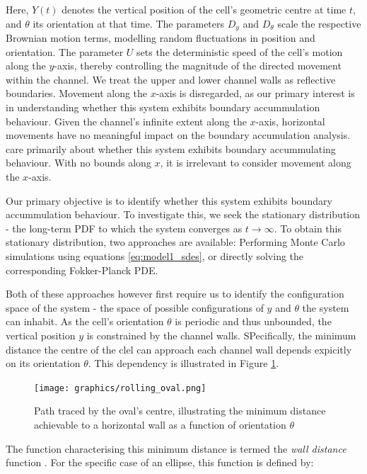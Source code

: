 Here, $Y(t)$ denotes the vertical position of the cell's geometric centre at time $t$,
and $\theta$ its orientation at that time. The parameters 
$D_y$ and $D_\theta$ scale the respective Brownian motion terms, modelling random
fluctuations in position and orientation. The parameter $U$ sets the deterministic speed 
of the cell's motion along the $y$-axis, thereby controlling the magnitude of the directed 
movement within the channel. We treat the upper and lower channel walls as 
reflective boundaries. Movement along the $x$-axis is disregarded, as our primary interest is in understanding
whether this system exhibits boundary accummulation behaviour. Given the channel's infinite extent along
the $x$-axis, horizontal movements have no meaningful impact on the boundary accumulation analysis. 
care primarily about whether this system exhibits boundary accummulating behaviour. With no bounds along $x$, 
it is irrelevant to consider movement along the $x$-axis. 

Our primary objective is to identify whether this system exhibits boundary accummulation behaviour. To
investigate this, we seek the stationary distribution - the long-term PDF to which the system converges as
$t \to \infty$. To obtain this stationary distribution, two approaches are available: Performing Monte Carlo 
simulations using equations \eqref{eq:model1_sdes}, or directly solving the corresponding Fokker-Planck PDE.

Both of these approaches however first require us to identify the configuration space of the system - the space of 
possible configurations of $y$ and $\theta$ the system can inhabit. As the cell's orientation $\theta$ is periodic
and thus unbounded, the vertical position $y$ is constrained by the channel walls. SPecifically, the minimum 
distance the centre of the clel can approach each channel wall depends expicitly on its orientation $\theta$. 
This dependency is illustrated in Figure \ref{fig:rolling_oval}.

\begin{figure}[htbp]
    \centering
    \texttt{[image: graphics/rolling\_oval.png]}
    \caption{Path traced by the oval's centre, illustrating the minimum distance achievable to a horizontal
    wall as a function of orientation $\theta$}
    \label{fig:rolling_oval}
\end{figure}

The function characterising this minimum distance is termed the \textit{wall distance} function
\cite{chen2021shape}. For the specific case of an ellipse, this function is defined by:

